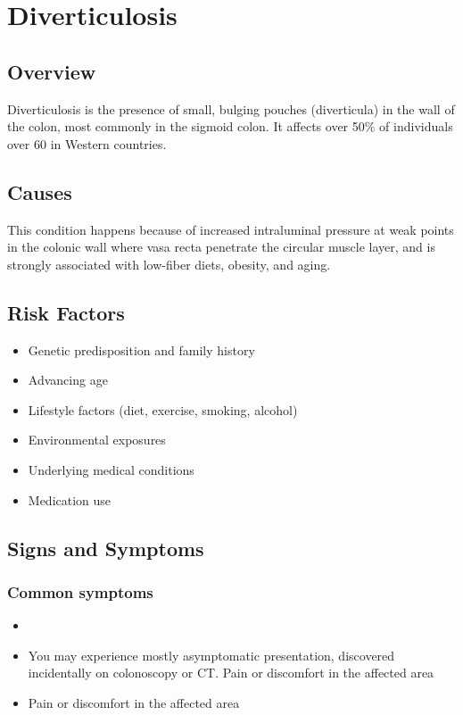 \chapter{Diverticulosis}
\label{sec:Diverticulosis}

\section{Overview}
Diverticulosis is the presence of small, bulging pouches (diverticula) in the wall of the colon, most commonly in the sigmoid colon. It affects over 50\% of individuals over 60 in Western countries.
\section{Causes}
This condition happens because of increased intraluminal pressure at weak points in the colonic wall where vasa recta penetrate the circular muscle layer, and is strongly associated with low-fiber diets, obesity, and aging.     
\section{Risk Factors}

\begin{itemize}[noitemsep]
  \item Genetic predisposition and family history
  \item Advancing age
  \item Lifestyle factors (diet, exercise, smoking, alcohol)
  \item Environmental exposures
  \item Underlying medical conditions
  \item Medication use
\end{itemize}
\section{Signs and Symptoms}

\subsection{Common symptoms}
\begin{itemize}[noitemsep]
  \item \item You may experience mostly asymptomatic presentation, discovered incidentally on colonoscopy or CT. Pain or discomfort in the affected area    \item Pain or discomfort in the affected area
  \end{itemize}

